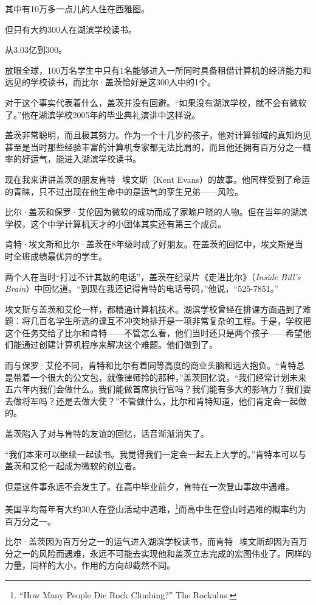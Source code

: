 其中有10万多一点儿的人住在西雅图。

但只有大约300人在湖滨学校读书。

从3.03亿到300。

放眼全球，100万名学生中只有1名能够进入一所同时具备租借计算机的经济能力和远见的学校读书，而比尔·盖茨恰好是这300人中的1个。

对于这个事实代表着什么，盖茨并没有回避。“如果没有湖滨学校，就不会有微软了。”他在湖滨学校2005年的毕业典礼演讲中这样说。

盖茨非常聪明，而且极其努力。作为一个十几岁的孩子，他对计算领域的真知灼见甚至是当时那些经验丰富的计算机专家都无法比肩的，而且他还拥有百万分之一概率的好运气，能进入湖滨学校读书。

现在我来讲讲盖茨的朋友肯特·埃文斯（Kent Evans）的故事。他同样受到了命运的青睐，只不过出现在他生命中的是运气的孪生兄弟——风险。

比尔·盖茨和保罗·艾伦因为微软的成功而成了家喻户晓的人物。但在当年的湖滨学校，这个中学计算机天才的小团体其实还有第三个成员。

肯特·埃文斯和比尔·盖茨在8年级时成了好朋友。在盖茨的回忆中，埃文斯是当时全班成绩最优异的学生。

两个人在当时“打过不计其数的电话”，盖茨在纪录片《走进比尔》（\textit{Inside Bill’s Brain}）中回忆道。“到现在我还记得肯特的电话号码，”他说，“525-7851。”

埃文斯与盖茨和艾伦一样，都精通计算机技术。湖滨学校曾经在排课方面遇到了难题：将几百名学生所选的课互不冲突地排开是一项非常复杂的工程。于是，学校把这个任务交给了比尔和肯特——不管怎么看，他们当时还只是两个孩子——希望他们能通过创建计算机程序来解决这个难题。他们做到了。

而与保罗·艾伦不同，肯特和比尔有着同等高度的商业头脑和远大抱负。“肯特总是带着一个很大的公文包，就像律师拎的那种，”盖茨回忆说，“我们经常计划未来五六年内我们会做什么。我们能做首席执行官吗？我们能有多大的影响力？我们要去做将军吗？还是去做大使？”不管做什么，比尔和肯特知道，他们肯定会一起做的。

盖茨陷入了对与肯特的友谊的回忆，话音渐渐消失了。

“我们本来可以继续一起读书。我觉得我们一定会一起去上大学的。”肯特本可以与盖茨和艾伦一起成为微软的创立者。

但是这件事永远不会发生了。在高中毕业前夕，肯特在一次登山事故中遇难。

美国平均每年有大约30人在登山活动中遇难，\footnote{“How Many People Die Rock Climbing?” The Rockulus.}而高中生在登山时遇难的概率约为百万分之一。

比尔·盖茨因为百万分之一的运气进入湖滨学校读书，而肯特·埃文斯却因为百万分之一的风险而遇难，永远不可能去实现他和盖茨立志完成的宏图伟业了。同样的力量，同样的大小，作用的方向却截然不同。


